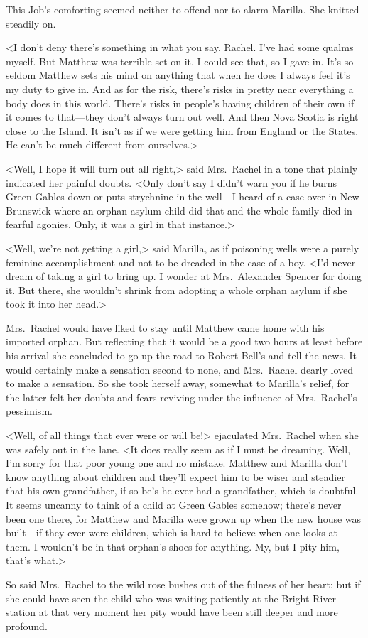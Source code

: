 This Job's comforting seemed neither to offend nor to alarm Marilla. She knitted steadily on.

<I don't deny there's something in what you say, Rachel. I've had some qualms myself. But Matthew was terrible set on it. I could see that, so I gave in. It's so seldom Matthew sets his mind on anything that when he does I always feel it's my duty to give in. And as for the risk, there's risks in pretty near everything a body does in this world. There's risks in people's having children of their own if it comes to that—they don't always turn out well. And then Nova Scotia is right close to the Island. It isn't as if we were getting him from England or the States. He can't be much different from ourselves.>

<Well, I hope it will turn out all right,> said Mrs.~Rachel in a tone that plainly indicated her painful doubts. <Only don't say I didn't warn you if he burns Green Gables down or puts strychnine in the well—I heard of a case over in New Brunswick where an orphan asylum child did that and the whole family died in fearful agonies. Only, it was a girl in that instance.>

<Well, we're not getting a girl,> said Marilla, as if poisoning wells were a purely feminine accomplishment and not to be dreaded in the case of a boy. <I'd never dream of taking a girl to bring up. I wonder at Mrs.~Alexander Spencer for doing it. But there, she wouldn't shrink from adopting a whole orphan asylum if she took it into her head.>

Mrs.~Rachel would have liked to stay until Matthew came home with his imported orphan. But reflecting that it would be a good two hours at least before his arrival she concluded to go up the road to Robert Bell's and tell the news. It would certainly make a sensation second to none, and Mrs.~Rachel dearly loved to make a sensation. So she took herself away, somewhat to Marilla's relief, for the latter felt her doubts and fears reviving under the influence of Mrs.~Rachel's pessimism.

<Well, of all things that ever were or will be!> ejaculated Mrs.~Rachel when she was safely out in the lane. <It does really seem as if I must be dreaming. Well, I'm sorry for that poor young one and no mistake. Matthew and Marilla don't know anything about children and they'll expect him to be wiser and steadier that his own grandfather, if so be's he ever had a grandfather, which is doubtful. It seems uncanny to think of a child at Green Gables somehow; there's never been one there, for Matthew and Marilla were grown up when the new house was built—if they ever were children, which is hard to believe when one looks at them. I wouldn't be in that orphan's shoes for anything. My, but I pity him, that's what.>

So said Mrs.~Rachel to the wild rose bushes out of the fulness of her heart; but if she could have seen the child who was waiting patiently at the Bright River station at that very moment her pity would have been still deeper and more profound.